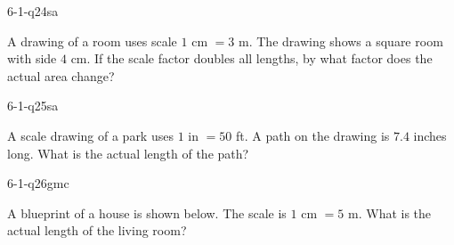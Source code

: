 \begin{practiceQuestion}{6-1-q24}{sa}
\begin{questionText}
A drawing of a room uses scale $1$ cm $= 3$ m. The drawing shows a square room with side $4$ cm. If the scale factor doubles all lengths, by what factor does the actual area change?
\end{questionText}
\end{practiceQuestion}

\begin{practiceQuestion}{6-1-q25}{sa}
\begin{questionText}
A scale drawing of a park uses $1$ in $= 50$ ft. A path on the drawing is $7.4$ inches long. What is the actual length of the path?
\end{questionText}
\end{practiceQuestion}


\begin{practiceQuestion}{6-1-q26}{gmc}
\begin{questionText}
A blueprint of a house is shown below. The scale is $1$ cm $= 5$ m. What is the actual length of the living room?

\begin{center}
\end{center}
\end{questionText}
\end{practiceQuestion}


